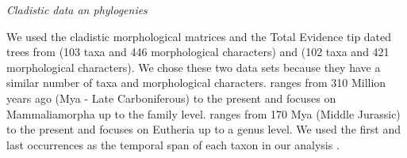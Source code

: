 \documentclass[12pt,letterpaper]{article}
\renewcommand{\subsection}[1]{%
\bigskip
\begin{center}
\begin{large}
\normalfont\itshape #1
\end{large}
\end{center}}
\begin{document}




\subsection{Cladistic data an phylogenies}
We used the cladistic morphological matrices and the Total Evidence tip dated trees \citep{ronquista2012} from \cite{Slater2012MEE} (103 taxa and 446 morphological characters) and \cite{beckancient2014} (102 taxa and 421 morphological characters).
We chose these two data sets because they have a similar number of taxa and morphological characters.
\cite{Slater2012MEE} ranges from 310 Million years ago (Mya - Late Carboniferous) to the present and focuses on Mammaliamorpha up to the family level.
\cite{beckancient2014} ranges from 170 Mya (Middle Jurassic) to the present and focuses on Eutheria up to a genus level.
We used the first and last occurrences as the temporal span of each taxon in our analysis \citep{Slater2012MEE,beckancient2014}.
\end{document}
